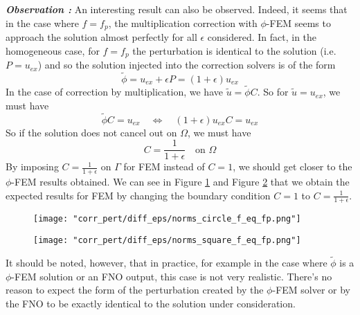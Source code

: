 \begin{enumerate}[label=\textbullet]
	\textbf{\textit{Observation :}} An interesting result can also be observed. Indeed, it seems that in the case where $f=f_p$, the multiplication correction with $\phi$-FEM seems to approach the solution almost perfectly for all $\epsilon$ considered.
	In fact, in the homogeneous case, for $f=f_p$ the perturbation is identical to the solution (i.e. $P=u_{ex}$) and so the solution injected into the correction solvers is of the form
	\begin{equation*}
		\tilde{\phi}=u_{ex}+\epsilon P=(1+\epsilon)u_{ex}
	\end{equation*}
	In the case of correction by multiplication, we have $\tilde{u}=\tilde{\phi}C$. So for $\tilde{u}=u_{ex}$, we must have
	\begin{equation*}
		\tilde{\phi}C=u_{ex} \quad \iff \quad (1+\epsilon)u_{ex}C=u_{ex}
	\end{equation*}
	So if the solution does not cancel out on $\Omega$, we must have
	\begin{equation*}
		C=\frac{1}{1+\epsilon} \quad \text{on } \Omega
	\end{equation*}
	By imposing $C=\frac{1}{1+\epsilon}$ on $\Gamma$ for FEM instead of $C=1$, we should get closer to the $\phi$-FEM results obtained. We can see in Figure \ref{norms_circle_f_eq_fp} and Figure \ref{norms_square_f_eq_fp} that we obtain the expected results for FEM by changing the boundary condition $C=1$ to $C=\frac{1}{1+\epsilon}$.
	
	\begin{minipage}{0.48\linewidth}
		\begin{figure}[H]
			\centering
			\texttt{[image: "corr\_pert/diff\_eps/norms\_circle\_f\_eq\_fp.png"]}
			\label{norms_circle_f_eq_fp}
		\end{figure} 
	\end{minipage}
	\begin{minipage}{0.48\linewidth}
		\begin{figure}[H]
			\centering
			\texttt{[image: "corr\_pert/diff\_eps/norms\_square\_f\_eq\_fp.png"]}
			\label{norms_square_f_eq_fp}
		\end{figure} 
	\end{minipage}
	\begin{Rem}
		It should be noted, however, that in practice, for example in the case where $\tilde{\phi}$ is a $\phi$-FEM solution or an FNO output, this case is not very realistic. There's no reason to expect the form of the perturbation created by the $\phi$-FEM solver or by the FNO to be exactly identical to the solution under consideration.
	\end{Rem}
	

\end{enumerate}
